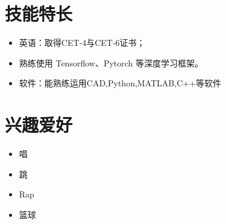 \begin{minipage}[t]{0.6\textwidth}
    \section[技能特长]{\makebox[\widthof{\faWrench}][c]{\color{FOSU_Red}{\faWrench}}\quad 技能特长}
    \begin{itemize}
    \setlength{\itemsep}{0.5em}
        \item 英语：取得CET‑4与CET‑6证书；
        \item 熟练使用 Tensorflow、Pytorch 等深度学习框架。
        \item 软件：能熟练运用CAD,Python,MATLAB,C++等软件
    \end{itemize}
\end{minipage}
\hfill
\begin{minipage}[t]{0.35\textwidth}
    \section[兴趣爱好]{\makebox[\widthof{\faWrench}][c]{\color{FOSU_Red}{\faStar}}\quad 兴趣爱好}
    \begin{itemize}
    \setlength{\itemsep}{0.5em}
        \item 唱
        \item 跳
        \item Rap
        \item 篮球
    \end{itemize}
\end{minipage}
  


